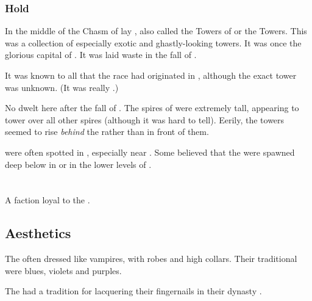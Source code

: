 \subsubsection{\Hyardes Hold}
\index{\Carcosa}
\index{\Hyardes}
In the middle of the Chasm of \Oggra lay \Carcosa, also called the Towers of \Hyardes or the \Hyardes Towers. 
This was a collection of especially exotic and ghastly-looking towers. 
It was once the glorious capital of \Tarcharos.
It was laid waste in the fall of \Tarcharos.

It was known to all \resphain that the \resphan race had originated in \Tarcharos, although the exact tower was unknown. 
(It was really .)

No \resphain dwelt here after the fall of \Tarcharos. 
The spires of \Carcosa were extremely tall, appearing to tower over all other spires (although it was hard to tell). 
Eerily, the towers seemed to rise \emph{behind} the  rather than in front of them. 

\Umbrae were often spotted in \Oggra, especially near \Carcosa.
Some believed that the \umbrae were spawned deep below in \Oggra or in the lower levels of \Carcosa. 















\section{\TiphredSerah}
A \resphan{} faction loyal to the \banes. 









\subsection{Aesthetics}

The \TiphredSerah{} often dressed like vampires, with robes and high collars. 
Their traditional \colours were blues, violets and purples.

The \TiphredSerah{} had a tradition for lacquering their fingernails in their dynasty \colours. 










